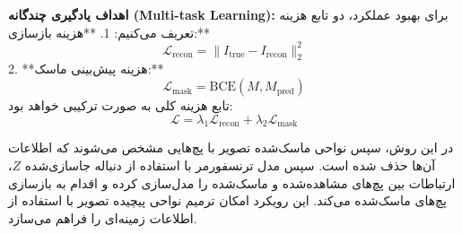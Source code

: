 %
%
%
%
%
%

\textbf{اهداف یادگیری چندگانه (Multi-task Learning):}  
برای بهبود عملکرد، دو تابع هزینه تعریف می‌کنیم:
1. **هزینه بازسازی:**
\[
\mathcal{L}_{\text{recon}} = \|I_{\text{true}} - I_{\text{recon}}\|_2^2
\]
2. **هزینه پیش‌بینی ماسک:**
\[
\mathcal{L}_{\text{mask}} = \text{BCE}(M, M_{\text{pred}})
\]
تابع هزینه کلی به صورت ترکیبی خواهد بود:
\[
\mathcal{L} = \lambda_1 \mathcal{L}_{\text{recon}} + \lambda_2 \mathcal{L}_{\text{mask}}
\]




در این روش، سپس نواحی ماسک‌شده تصویر با پچ‌هایی مشخص می‌شوند که اطلاعات آن‌ها حذف شده است. سپس مدل ترنسفورمر با استفاده از دنباله جاسازی‌شده $Z$، ارتباطات بین پچ‌های مشاهده‌شده و ماسک‌شده را مدل‌سازی کرده و اقدام به بازسازی پچ‌های ماسک‌شده می‌کند. این رویکرد امکان ترمیم نواحی پیچیده تصویر با استفاده از اطلاعات زمینه‌ای را فراهم می‌سازد.


%
%
%
%
%


\warningToSelfUnfinished